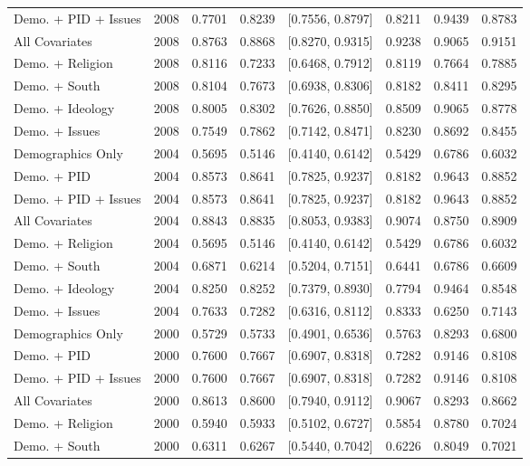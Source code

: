 \begin{longtable}{lrrrlrrr}
  Demo. + PID + Issues & 2008 & 0.7701 & 0.8239 & [0.7556, 0.8797] & 0.8211 & 0.9439 & 0.8783 \\ 
  All Covariates & 2008 & 0.8763 & 0.8868 & [0.8270, 0.9315] & 0.9238 & 0.9065 & 0.9151 \\ 
  Demo. + Religion & 2008 & 0.8116 & 0.7233 & [0.6468, 0.7912] & 0.8119 & 0.7664 & 0.7885 \\ 
  Demo. + South & 2008 & 0.8104 & 0.7673 & [0.6938, 0.8306] & 0.8182 & 0.8411 & 0.8295 \\ 
  Demo. + Ideology & 2008 & 0.8005 & 0.8302 & [0.7626, 0.8850] & 0.8509 & 0.9065 & 0.8778 \\ 
  Demo. + Issues & 2008 & 0.7549 & 0.7862 & [0.7142, 0.8471] & 0.8230 & 0.8692 & 0.8455 \\ 
  Demographics Only & 2004 & 0.5695 & 0.5146 & [0.4140, 0.6142] & 0.5429 & 0.6786 & 0.6032 \\ 
  Demo. + PID & 2004 & 0.8573 & 0.8641 & [0.7825, 0.9237] & 0.8182 & 0.9643 & 0.8852 \\ 
  Demo. + PID + Issues & 2004 & 0.8573 & 0.8641 & [0.7825, 0.9237] & 0.8182 & 0.9643 & 0.8852 \\ 
  All Covariates & 2004 & 0.8843 & 0.8835 & [0.8053, 0.9383] & 0.9074 & 0.8750 & 0.8909 \\ 
  Demo. + Religion & 2004 & 0.5695 & 0.5146 & [0.4140, 0.6142] & 0.5429 & 0.6786 & 0.6032 \\ 
  Demo. + South & 2004 & 0.6871 & 0.6214 & [0.5204, 0.7151] & 0.6441 & 0.6786 & 0.6609 \\ 
  Demo. + Ideology & 2004 & 0.8250 & 0.8252 & [0.7379, 0.8930] & 0.7794 & 0.9464 & 0.8548 \\ 
  Demo. + Issues & 2004 & 0.7633 & 0.7282 & [0.6316, 0.8112] & 0.8333 & 0.6250 & 0.7143 \\ 
  Demographics Only & 2000 & 0.5729 & 0.5733 & [0.4901, 0.6536] & 0.5763 & 0.8293 & 0.6800 \\ 
  Demo. + PID & 2000 & 0.7600 & 0.7667 & [0.6907, 0.8318] & 0.7282 & 0.9146 & 0.8108 \\ 
  Demo. + PID + Issues & 2000 & 0.7600 & 0.7667 & [0.6907, 0.8318] & 0.7282 & 0.9146 & 0.8108 \\ 
  All Covariates & 2000 & 0.8613 & 0.8600 & [0.7940, 0.9112] & 0.9067 & 0.8293 & 0.8662 \\ 
  Demo. + Religion & 2000 & 0.5940 & 0.5933 & [0.5102, 0.6727] & 0.5854 & 0.8780 & 0.7024 \\ 
  Demo. + South & 2000 & 0.6311 & 0.6267 & [0.5440, 0.7042] & 0.6226 & 0.8049 & 0.7021 \\ 

\end{longtable}
